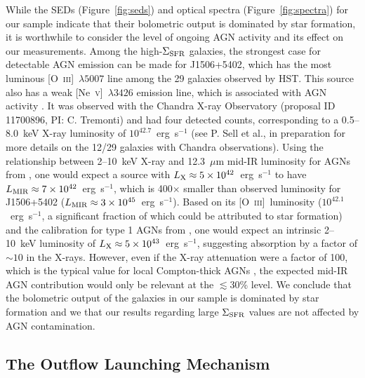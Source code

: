 \documentclass[apj]{emulateapj}
\newcommand{\nev}{[\textrm{Ne}~\textsc{v}]}
\newcommand{\oiii}{[\textrm{O}~\textsc{iii}]}
\newcommand{\sigmasfr}{\Sigma_{\textnormal{\scriptsize{SFR}}}}
\begin{document}
While the SEDs (Figure~\ref{fig:seds}) and optical spectra
(Figure~\ref{fig:spectra}) for our sample indicate that their
bolometric output is dominated by star formation, it is worthwhile to
consider the level of ongoing AGN activity and its effect on our
measurements.  Among the high-$\sigmasfr$ galaxies, the strongest case
for detectable AGN emission can be made for J1506+5402, which has the
most luminous \oiii~$\lambda5007$ line among the 29 galaxies observed
by HST.  This source also has a weak \nev~$\lambda3426$ emission line,
which is associated with AGN activity \citep[e.g.,][]{gil10}.  It was
observed with the Chandra X-ray Observatory (proposal ID 11700896, PI:
C. Tremonti) and had four detected counts, corresponding to a
0.5--8.0~keV X-ray luminosity of $10^{42.7}$~erg~s$^{-1}$ (see P. Sell
et al., in preparation for more details on the 12/29 galaxies with
Chandra observations).  Using the relationship between 2--10~keV X-ray
and 12.3~$\mu$m mid-IR luminosity for AGNs from \citet{gan09}, one
would expect a source with
$L_{\textnormal{\scriptsize{X}}}\approx5\times10^{42}$~erg~s$^{-1}$ to
have
$L_{\textnormal{\scriptsize{MIR}}}\approx7\times10^{42}$~erg~s$^{-1}$,
which is 400$\times$ smaller than observed luminosity for J1506+5402
($L_{\textnormal{\scriptsize{MIR}}}\approx3\times10^{45}$~erg~s$^{-1}$).
Based on its \oiii\ luminosity ($10^{42.1}$~erg~s$^{-1}$, a
significant fraction of which could be attributed to star formation)
and the calibration for type 1 AGNs from \citet{hec05}, one would
expect an intrinsic 2--10~keV luminosity of
$L_{\textnormal{\scriptsize{X}}}\approx5\times10^{43}$~erg~s$^{-1}$,
suggesting absorption by a factor of $\sim10$ in the X-rays.  However,
even if the X-ray attenuation were a factor of 100, which is the
typical value for local Compton-thick AGNs \citep{dia09}, the expected
mid-IR AGN contribution would only be relevant at the $\lesssim$30\%
level.  We conclude that the bolometric output of the galaxies in our
sample is dominated by star formation and we that our results
regarding large $\sigmasfr$ values are not affected by AGN
contamination.



\subsection{The Outflow Launching Mechanism}\label{sec:launch}
\end{document}
